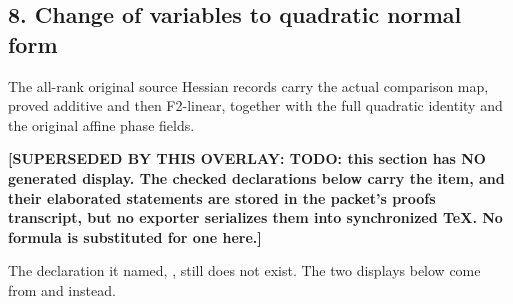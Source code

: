 \subsection*{8. Change of variables to quadratic normal form}
The all-rank original source Hessian records carry the actual comparison map, proved additive and then F2-linear, together with the full quadratic identity and the original affine phase fields.

\par\noindent\textbf{[SUPERSEDED BY THIS OVERLAY: TODO: this section has NO generated display. The checked declarations below carry the item, and their elaborated statements are stored in the packet's proofs transcript, but no exporter serializes them into synchronized TeX. No formula is substituted for one here.]}
\par\noindent The declaration it named, , still does not exist. The two displays below come from  and  instead.
